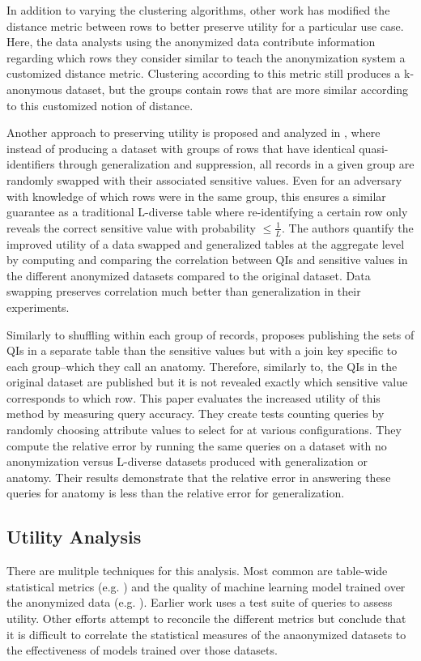 In addition to varying the clustering algorithms, other work has modified the distance metric between rows to better preserve utility for a particular use case\cite{jiaPad}. Here, the data analysts using the anonymized data contribute information regarding which rows they consider similar to teach the anonymization system a customized distance metric. Clustering according to this metric still produces a k-anonymous dataset, but the groups contain rows that are more similar according to this customized notion of distance.

Another approach to preserving utility is proposed and analyzed in \cite{soriaSwapping}, where instead of producing a dataset with groups of rows that have identical quasi-identifiers through generalization and suppression, all records in a given group are randomly swapped with their associated sensitive values. Even for an adversary with knowledge of which rows were in the same group, this ensures a similar guarantee as a traditional L-diverse table where re-identifying a certain row only reveals the correct sensitive value with probability $\leq\frac{1}{L}$. The authors quantify the improved utility of a data swapped and generalized tables at the aggregate level by computing and comparing the correlation between QIs and sensitive values in the different anonymized datasets compared to the original dataset. Data swapping preserves correlation much better than generalization in their experiments.

Similarly to shuffling within each group of records, \cite{xiaoAnatomy} proposes publishing the sets of QIs in a separate table than the sensitive values but with a join key specific to each group--which they call an anatomy. Therefore, similarly to\cite{soriaSwapping}, the QIs in the original dataset are published but it is not revealed exactly which sensitive value corresponds to which row. This paper evaluates the increased utility of this method by measuring query accuracy. They create tests counting queries by randomly choosing attribute values to select for at various configurations. They compute the relative error by running the same queries on a dataset with no anonymization versus L-diverse datasets produced with generalization or anatomy. Their results demonstrate that the relative error in answering these queries for anatomy is less than the relative error for generalization.

\subsection{Utility Analysis}
There are mulitple techniques for this analysis. Most common are table-wide statistical metrics (e.g. \cite{soriaSwapping}) and the quality of machine learning model trained over the anonymized data (e.g. \cite{sangogboyePad}). Earlier work\cite{xiaoAnatomy} uses a test suite of queries to assess utility. Other efforts attempt to reconcile the different metrics but conclude that it is difficult to correlate the statistical measures of the anaonymized datasets to the effectiveness of models trained over those datasets\cite{vsarvcevicEffectiveness}.

